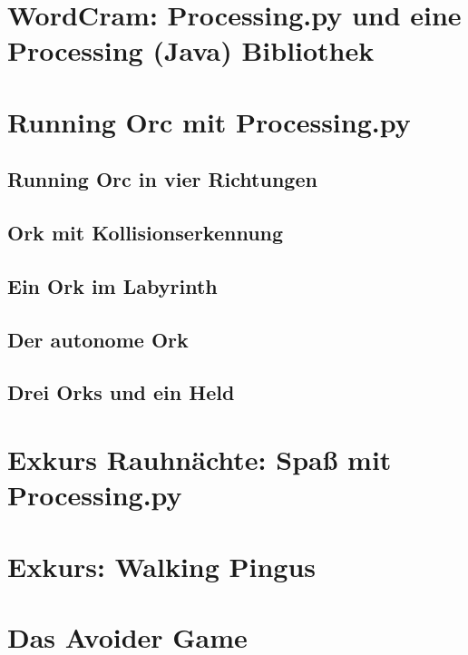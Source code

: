 \documentclass[10pt,german,]{book}
\begin{document}
\chapter{WordCram: Processing.py und eine Processing (Java)
Bibliothek}\label{wordcram-processing.py-und-eine-processing-java-bibliothek}

\chapter{Running Orc mit
Processing.py}\label{running-orc-mit-processing.py}

\section{Running Orc in vier
Richtungen}\label{running-orc-in-vier-richtungen}

\section{Ork mit Kollisionserkennung}\label{ork-mit-kollisionserkennung}

\section{Ein Ork im Labyrinth}\label{ein-ork-im-labyrinth}

\section{Der autonome Ork}\label{der-autonome-ork}

\section{Drei Orks und ein Held}\label{drei-orks-und-ein-held}

\chapter{Exkurs Rauhnächte: Spaß mit
Processing.py}\label{exkurs-rauhnuxe4chte-spauxdf-mit-processing.py}

\chapter{Exkurs: Walking Pingus}\label{exkurs-walking-pingus}

\chapter{Das Avoider Game}\label{das-avoider-game}
\end{document}
